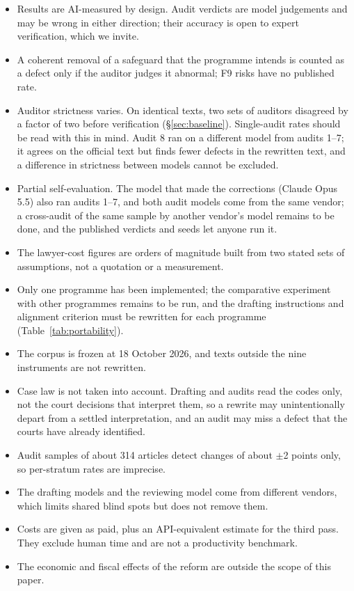 \documentclass[11pt,a4paper]{article}
\begin{document}
\begin{itemize}
  \item Results are AI-measured by design. Audit verdicts are model judgements and may be wrong in either direction; their accuracy is open to expert verification, which we invite.
  \item A coherent removal of a safeguard that the programme intends is counted as a defect only if the auditor judges it abnormal; F9 risks have no published rate.
  \item Auditor strictness varies. On identical texts, two sets of auditors disagreed by a factor of two before verification (\S\ref{sec:baseline}). Single-audit rates should be read with this in mind. Audit 8 ran on a different model from audits 1--7; it agrees on the official text but finds fewer defects in the rewritten text, and a difference in strictness between models cannot be excluded.
  \item Partial self-evaluation. The model that made the corrections (Claude Opus 5.5) also ran audits 1--7, and both audit models come from the same vendor; a cross-audit of the same sample by another vendor's model remains to be done, and the published verdicts and seeds let anyone run it.
  \item The lawyer-cost figures are orders of magnitude built from two stated sets of assumptions, not a quotation or a measurement.
  \item Only one programme has been implemented; the comparative experiment with other programmes remains to be run, and the drafting instructions and alignment criterion must be rewritten for each programme (Table~\ref{tab:portability}).
  \item The corpus is frozen at 18 October 2026, and texts outside the nine instruments are not rewritten.
  \item Case law is not taken into account. Drafting and audits read the codes only, not the court decisions that interpret them, so a rewrite may unintentionally depart from a settled interpretation, and an audit may miss a defect that the courts have already identified.
  \item Audit samples of about 314 articles detect changes of about $\pm$2 points only, so per-stratum rates are imprecise.
  \item The drafting models and the reviewing model come from different vendors, which limits shared blind spots but does not remove them.
  \item Costs are given as paid, plus an API-equivalent estimate for the third pass. They exclude human time and are not a productivity benchmark.
  \item The economic and fiscal effects of the reform are outside the scope of this paper.
\end{itemize}
\end{document}
